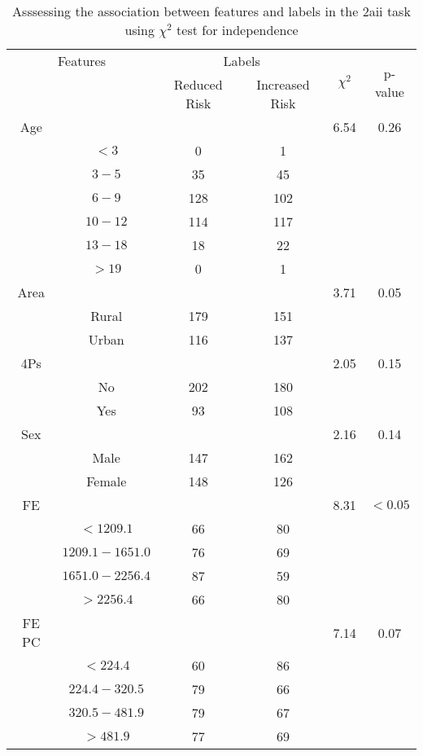 \begin{table}[!htb]
\centering
\caption{Asssessing the association between features and labels in the 2aii task using $\chi^2$ test for independence}
\label{tab:chitest_2aii}
\begin{tabular}{c c | c c| c | c}
\hline
\multicolumn{2}{c|}{Features}& \multicolumn{2}{c|}{Labels}& \multirow{2}{*}{$\chi^2$} & \multirow{2}{*}{p-value}\\ 
& & Reduced Risk & Increased Risk & & \\ 
\hline
Age &  &  & & 6.54 & 0.26 \\ 
& $< 3$ & 0 & 1& & \\ 
& $3-5$ & 35 & 45& & \\ 
& $6-9$ & 128 & 102& & \\ 
& $10-12$ & 114 & 117& & \\ 
& $13-18$ & 18 & 22& & \\ 
& $> 19$ & 0 & 1& & \\ 
\hline 
Area &  &  & & 3.71 & 0.05 \\ 
& Rural & 179 & 151& & \\ 
& Urban & 116 & 137& & \\ 
\hline 
4Ps &  &  & & 2.05 & 0.15 \\ 
& No & 202 & 180& & \\ 
& Yes & 93 & 108& & \\ 
\hline 
Sex &  &  & & 2.16 & 0.14 \\ 
& Male & 147 & 162& & \\ 
& Female & 148 & 126& & \\ 
\hline 
FE &  &  & & 8.31 & $< 0.05$ \\ 
& $< 1209.1$ & 66 & 80& & \\ 
& $1209.1-1651.0$ & 76 & 69& & \\ 
& $1651.0-2256.4$ & 87 & 59& & \\ 
& $> 2256.4$ & 66 & 80& & \\ 
\hline 
FE PC &  &  & & 7.14 & 0.07 \\ 
& $< 224.4$ & 60 & 86& & \\ 
& $224.4-320.5$ & 79 & 66& & \\ 
& $320.5-481.9$ & 79 & 67& & \\ 
& $> 481.9$ & 77 & 69& & \\ 
\hline 
\end{tabular}
\end{table}
